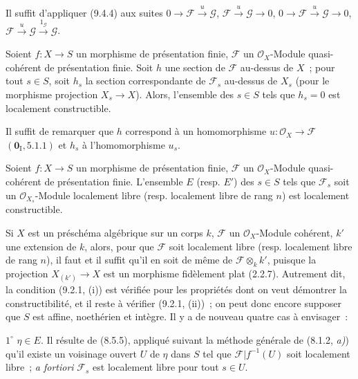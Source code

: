 Il suffit d'appliquer (9.4.4) aux suites
$0\to\mathcal F\xrightarrow{u}\mathcal G$,
$\mathcal F\xrightarrow{u}\mathcal G\to0$,
$0\to\mathcal F\xrightarrow{u}\mathcal G\to0$,
$\mathcal F\xrightarrow{u}\mathcal G\xrightarrow{1_\mathcal G}\mathcal G$.

\begin{corollary}[9.4.6]
\label{IV.9.4.6-fr}
Soient $f:X\to S$ un morphisme de présentation finie, $\mathcal F$ un
$\mathcal O_X$-Module quasi-cohérent de présentation finie. Soit $h$ une
section de $\mathcal F$ au-dessus de $X$~; pour tout $s\in S$, soit $h_s$ la
section correspondante de $\mathcal F_s$ au-dessus de $X_s$ \textnormal{(}pour
le morphisme projection $X_s\to X$\textnormal{)}. Alors, l'ensemble des
$s\in S$ tels que $h_s=0$ est localement constructible.
\end{corollary}

Il suffit de remarquer que $h$ correspond à un homomorphisme
$u:\mathcal O_X\to\mathcal F$ $(\mathbf 0_{\mathrm I},5.1.1)$ et $h_s$ à
l'homomorphisme $u_s$.

\begin{proposition}[9.4.7]
\label{IV.9.4.7-fr}
Soient $f:X\to S$ un morphisme de présentation finie, $\mathcal F$ un
$\mathcal O_X$-Module quasi-cohérent de présentation finie. L'ensemble $E$
\textnormal{(resp.} $E'$\textnormal{)} des $s\in S$ tels que $\mathcal F_s$
soit un $\mathcal O_{X_s}$-Module localement libre \textnormal{(resp.}
localement libre de rang $n$\textnormal{)} est localement constructible.
\end{proposition}

Si $X$ est un préschéma algébrique sur un corps $k$, $\mathcal F$ un
$\mathcal O_X$-Module cohérent, $k'$ une extension de $k$, alors, pour que
$\mathcal F$ soit localement libre (resp. localement libre de rang $n$), il
faut et il suffit qu'il en soit de même de $\mathcal F\otimes_k k'$, puisque la
projection $X_{(k')}\to X$ est un morphisme fidèlement plat (2.2.7). Autrement
dit, la condition (9.2.1, (i)) est vérifiée pour les propriétés dont on veut
démontrer la constructibilité, et il reste à vérifier (9.2.1, (ii))~; on peut
donc encore supposer que $S$ est affine, noethérien et intègre. Il y a de
nouveau quatre cas à envisager~:

$1^\circ$ $\eta\in E$. Il résulte de (8.5.5), appliqué suivant la méthode
générale de (8.1.2, \emph{a)}) qu'il existe un voisinage ouvert $U$ de $\eta$
dans $S$ tel que $\mathcal F|f^{-1}(U)$ soit localement libre~;
\emph{a fortiori} $\mathcal F_s$ est localement libre pour tout $s\in U$.

